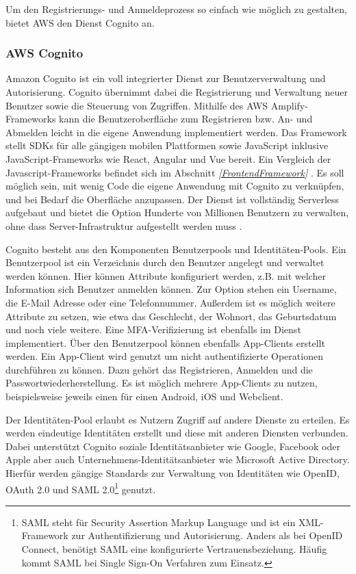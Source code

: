 {Um den Registrierungs- und Anmeldeprozess so einfach wie möglich zu gestalten, bietet AWS den Dienst Cognito an.

\subsubsection{AWS Cognito}
\label{Cognito}
Amazon Cognito ist ein voll integrierter Dienst zur Benutzerverwaltung und Autorisierung.
Cognito übernimmt dabei die Registrierung und Verwaltung neuer Benutzer sowie die Steuerung von Zugriffen.
Mithilfe des AWS Amplify-Frameworks kann die Benutzeroberfläche zum Registrieren bzw. An- und Abmelden leicht in die eigene Anwendung implementiert werden.
Das Framework stellt SDKs für alle gängigen mobilen Plattformen sowie JavaScript inklusive JavaScript-Frameworks wie React, Angular und Vue bereit.
Ein Vergleich der Javascript-Frameworks befindet sich im Abschnitt \textit{\ref{FrontendFramework} }.
Es soll möglich sein, mit wenig Code die eigene Anwendung mit Cognito zu verknüpfen, und bei Bedarf die Oberfläche anzupassen.
Der Dienst ist vollständig Serverless aufgebaut und bietet die Option \glqq Hunderte von Millionen Benutzern\grqq{} zu verwalten,
\glqq ohne dass Server-Infrastruktur aufgestellt werden muss\grqq{} \cite[]{CognitoUebersicht}. \cite[]{Cognito2}

Cognito besteht aus den Komponenten Benutzerpools und Identitäten-Pools.
Ein Benutzerpool ist ein Verzeichnis durch den Benutzer angelegt und verwaltet werden können.
Hier können Attribute konfiguriert werden, z.B. mit welcher Information sich Benutzer anmelden können.
Zur Option stehen ein Username, die E-Mail Adresse oder eine Telefonnummer.
Außerdem ist es möglich weitere Attribute zu setzen, wie etwa das Geschlecht, der Wohnort, das Geburtsdatum und noch viele weitere.
Eine MFA-Verifizierung ist ebenfalls im Dienst implementiert.
Über den Benutzerpool können ebenfalls App-Clients erstellt werden.
Ein App-Client wird genutzt um nicht authentifizierte Operationen durchführen zu können.
Dazu gehört das Registrieren, Anmelden und die Passwortwiederherstellung.
Es ist möglich mehrere App-Clients zu nutzen, beispielsweise jeweils einen für einen Android, iOS und Webclient.

Der Identitäten-Pool erlaubt es Nutzern Zugriff auf andere Dienste zu erteilen. Es werden eindeutige Identitäten erstellt und diese mit anderen Diensten verbunden.
Dabei unterstützt Cognito soziale Identitätsanbieter wie Google, Facebook oder Apple aber auch Unternehmens-Identitätsanbieter wie Microsoft Active Directory.
Hierfür werden gängige Standards zur Verwaltung von Identitäten wie OpenID, OAuth 2.0 und SAML 2.0\footnote{SAML steht für Security Assertion Markup Language und ist ein XML-Framework zur  Authentifizierung und Autorisierung.
Anders als bei OpenID Connect, benötigt SAML eine konfigurierte Vertrauensbeziehung. Häufig kommt SAML bei Single Sign-On Verfahren zum Einsatz. } genutzt. \cite[]{Cognito1}

}
